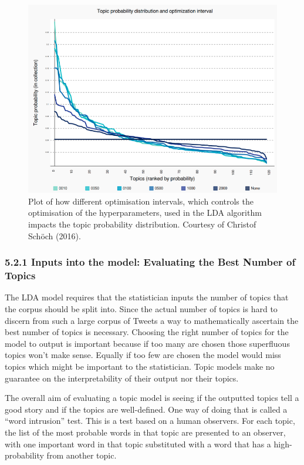 \documentclass[
]{article}
\begin{document}
\begin{figure}

{\centering \includegraphics[width=1\linewidth]{images/optinterval} 

}

\caption{Plot of how different optimisation intervals, which controls the optimisation of the hyperparameters, used in the LDA algorithm impacts the topic probability distribution. Courtesy of Christof Schöch (2016).}\label{fig:optint}
\end{figure}

\hypertarget{inputs-into-the-model-evaluating-the-best-number-of-topics}{%
\subsubsection{5.2.1 Inputs into the model: Evaluating the Best Number
of
Topics}\label{inputs-into-the-model-evaluating-the-best-number-of-topics}}

The LDA model requires that the statistician inputs the number of topics
that the corpus should be split into. Since the actual number of topics
is hard to discern from such a large corpus of Tweets a way to
mathematically ascertain the best number of topics is necessary.
Choosing the right number of topics for the model to output is important
because if too many are chosen those superfluous topics won't make
sense. Equally if too few are chosen the model would miss topics which
might be important to the statistician. Topic models make no guarantee
on the interpretability of their output nor their topics.

The overall aim of evaluating a topic model is seeing if the outputted
topics tell a good story and if the topics are well-defined. One way of
doing that is called a ``word intrusion'' test. This is a test based on
a human observers. For each topic, the list of the most probable words
in that topic are presented to an observer, with one important word in
that topic substituted with a word that has a high-probability from
another topic.
\end{document}
